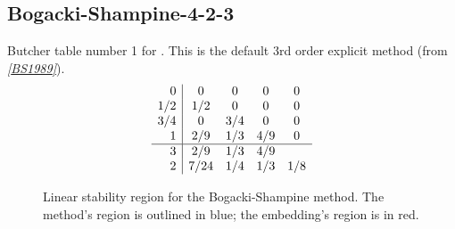 \documentclass[letterpaper,10pt,english]{sphinxmanual}
\begin{document}
\subsection{Bogacki-Shampine-4-2-3}
\label{Butcher:bogacki-shampine-4-2-3}\label{Butcher:butcher-bogacki-shampine}
Butcher table number 1
for {\hyperref[c_interface/User_callable:c.ARKodeSetERKTableNum]{\emph{}}}.  This is
the default 3rd order explicit method (from \label{Butcher:id1}{\hyperref[References:bs1989]{\emph{{[}BS1989{]}}}}).
\begin{gather}
\begin{split}\begin{array}{r|cccc}
  0 &   0 & 0 & 0 & 0 \\
  1/2 & 1/2 & 0 & 0 & 0 \\
  3/4 & 0 & 3/4 & 0 & 0 \\
  1   & 2/9 & 1/3 & 4/9 & 0 \\
  \hline
  3 & 2/9 & 1/3 & 4/9 \\
  2 & 7/24 & 1/4 & 1/3 & 1/8
\end{array}\end{split}\notag
\end{gather}\begin{figure}[htbp]
\centering
\capstart

\caption{Linear stability region for the Bogacki-Shampine method.  The method's
region is outlined in blue; the embedding's region is in red.}\end{figure}
\end{document}
